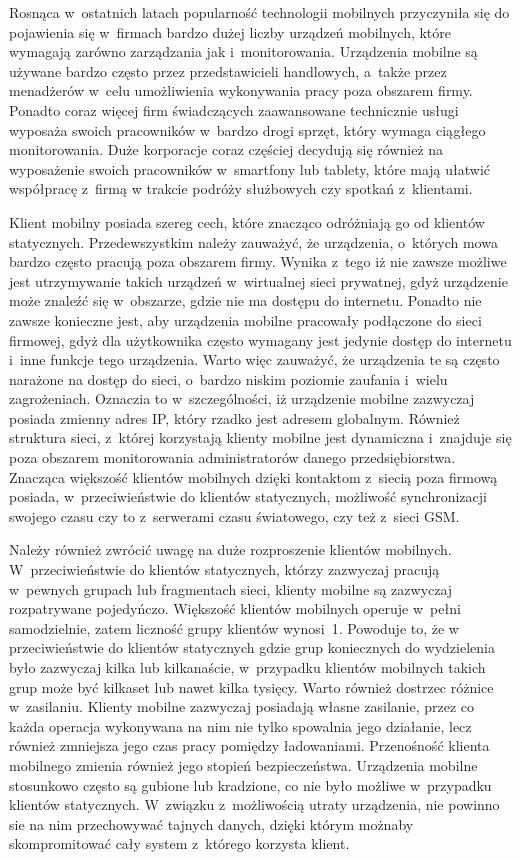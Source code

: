 Rosnąca w~ostatnich latach popularność technologii mobilnych
przyczyniła się do pojawienia się w~firmach bardzo dużej liczby
urządzeń mobilnych, które wymagają zarówno zarządzania jak
i~monitorowania. Urządzenia mobilne są używane bardzo często przez
przedstawicieli handlowych, a~także przez menadżerów w~celu
umożliwienia wykonywania pracy poza obszarem firmy. Ponadto coraz
więcej firm świadczących zaawansowane technicznie usługi wyposaża
swoich pracowników w~bardzo drogi sprzęt, który wymaga ciągłego
monitorowania. Duże korporacje coraz częściej decydują się również na
wyposażenie swoich pracowników w~smartfony lub tablety, które mają
ułatwić współpracę z~firmą w trakcie podróży służbowych czy spotkań
z~klientami.

Klient mobilny posiada szereg cech, które znacząco odróżniają go od
klientów statycznych. Przedewszystkim należy zauważyć, że urządzenia,
o~których mowa bardzo często pracują poza obszarem firmy. Wynika
z~tego iż nie zawsze możliwe jest utrzymywanie takich urządzeń
w~wirtualnej sieci prywatnej, gdyż urządzenie może znaleźć się
w~obszarze, gdzie nie ma dostępu do internetu. Ponadto nie zawsze
konieczne jest, aby urządzenia mobilne pracowały podłączone do sieci
firmowej, gdyż dla użytkownika często wymagany jest jedynie dostęp do
internetu i~inne funkcje tego urządzenia. Warto więc zauważyć, że
urządzenia te są często narażone na dostęp do sieci, o~bardzo niskim
poziomie zaufania i~wielu zagrożeniach. Oznaczia to w~szczególności,
iż urządzenie mobilne zazwyczaj posiada zmienny adres IP, który rzadko
jest adresem globalnym. Również struktura sieci, z~której korzystają
klienty mobilne jest dynamiczna i~znajduje się poza obszarem
monitorowania administratorów danego przedsiębiorstwa. Znacząca
większość klientów mobilnych dzięki kontaktom z~siecią poza firmową
posiada, w~przeciwieństwie do klientów statycznych, możliwość
synchronizacji swojego czasu czy to z~serwerami czasu światowego, czy
też z~sieci GSM.

Należy również zwrócić uwagę na duże rozproszenie klientów
mobilnych. W~przeciwieństwie do klientów statycznych, którzy zazwyczaj
pracują w~pewnych grupach lub fragmentach sieci, klienty mobilne są
zazwyczaj rozpatrywane pojedyńczo. Większość klientów mobilnych
operuje w~pełni samodzielnie, zatem liczność grupy klientów
wynosi~1. Powoduje to, że w przeciwieństwie do klientów statycznych
gdzie grup koniecznych do wydzielenia było zazwyczaj kilka lub
kilkanaście, w~przypadku klientów mobilnych takich grup może być
kilkaset lub nawet kilka tysięcy. Warto również dostrzec różnice
w~zasilaniu. Klienty mobilne zazwyczaj posiadają własne zasilanie,
przez co każda operacja wykonywana na nim nie tylko spowalnia jego
działanie, lecz również zmniejsza jego czas pracy pomiędzy
ładowaniami. Przenośność klienta mobilnego zmienia również jego
stopień bezpieczeństwa. Urządzenia mobilne stosunkowo często są
gubione lub kradzione, co nie było możliwe w~przypadku klientów
statycznych. W~związku z~możliwością utraty urządzenia, nie powinno
sie na nim przechowywać tajnych danych, dzięki którym możnaby
skompromitować cały system z~którego korzysta klient.

